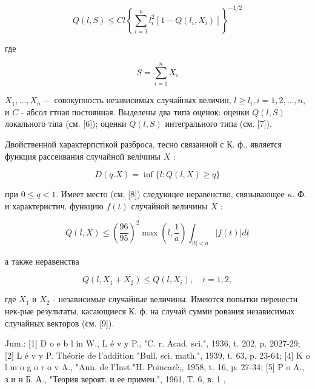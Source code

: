 \documentclass[10pt]{article}
\begin{document}
\[

Q(l, S) \leqslant C l\left\{\sum_{i=1}^{n} l_{i}^{2}\left[1-Q\left(l_{i}, X_{i}\right)\right]\right\}^{-1 / 2}

\]



где



\[

S=\sum_{i=1}^{n} X_{i}

\]



$X_{1}, \ldots, X_{n}-$ совокупность независимых случайных величин, $l \geqslant l_{i}, i=1,2, \ldots, n$, и $C$ - абсол гтная постоянная. Выделены два типа оценок: оценки $Q(l, S)$ локального тіпа (см. [6]); оценки $Q(l, S)$ интегрального типа (см. [7]).



Двойственной характерпстікой разброса, тесно связанной с К. ф., является функция рассеивания случайной велічины $X$ :



\[

D(q . X)=\inf \{l: Q(l, X) \geqslant q\}

\]



при $0 \leqslant q<1$. Имеет место (см. [8]) следующее неравенство, связывающее $\kappa$. Ф. и характеристич. функцию $f(t)$ случайной величины $X$ :



\[

Q(l, X) \leqslant\left(\frac{96}{95}\right)^{2} \max \left(l, \frac{1}{a}\right) \int_{|t|<a}|f(t)| d t

\]



а также неравенства



\[

Q\left(l, X_{1}+X_{2}\right) \leqslant Q\left(l, X_{i}\right), \quad i=1,2,

\]



где $X_{1}$ и $X_{2}$ - независимые случайные величины. Имеются попытки перенести нек-рые результаты, касающиеся К. ф. на случай сумми рования независимых случайных векторов (см. [9]).



Jum.: [1] D o e b l in W., L é v y P., "C. r. Acad. sci.", 1936, t. 202, p. 2027-29; [2] L é v y P. Théorie de l'addition "Bull. sci. math.", 1939, t. 63, p. 23-64; [4] K o l m o g o r o v A., "Ann. de l'Inst."H. Poincarè,, 1958, t. 16, p. 27-34; [5] P o A., з и н Б. А., "Теория вероят. и ее примен.", 1961, Т. 6, в. 1 ,
\end{document}
